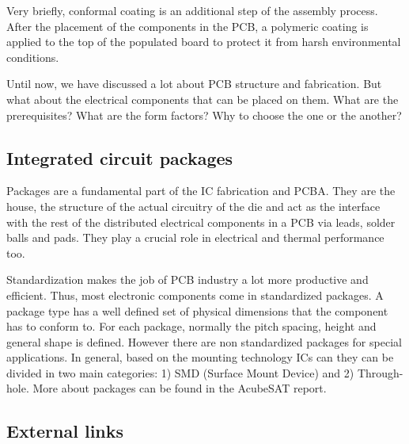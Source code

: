 \documentclass[final]{cubedoc}
\begin{document}
	Very briefly, conformal coating is an additional step of the assembly process. After the placement of the components in the PCB, a polymeric coating is applied to the top of the populated board to protect it from harsh environmental conditions.
	
	Until now, we have discussed a lot about PCB structure and fabrication. But what about the electrical components that can be placed on them. What are the prerequisites? What are the form factors? Why to choose the one or the another?
	
	\subsection{Integrated circuit packages}
	
	Packages are a fundamental part of the IC fabrication and PCBA. They are the house, the structure of the actual circuitry of the die and act as the interface with the rest of the distributed electrical components in a PCB via leads, solder balls and pads. They play a crucial role in electrical and thermal performance too.
	
	Standardization makes the job of PCB industry a lot more productive and efficient. Thus, most electronic components come in standardized packages. A package type has a well defined set of physical dimensions that the component has to conform to. For each package, normally the pitch spacing, height and general shape is defined. However there are non standardized packages for special applications. In general, based on the mounting technology ICs can they can be divided in two main categories: 1) SMD (Surface Mount Device) and 2) Through-hole. More about packages can be found in the AcubeSAT report.
	
	\subsection{External links} %
	
\end{document}
